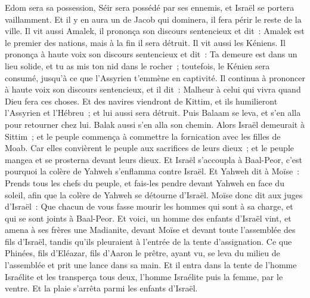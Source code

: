 \begin{multicols}{2}
Edom sera sa possession, Séir sera possédé par ses ennemis, et Israël se portera vaillamment.
Et il y en aura un de Jacob qui dominera, il fera périr le reste de la ville.
Il vit aussi Amalek, il prononça son discours sentencieux et dit~: Amalek est le premier des nations, mais à la fin il sera détruit.
Il vit aussi les Kéniens. Il prononça à haute voix son discours sentencieux et dit~: Ta demeure est dans un lieu solide, et tu as mis ton nid dans le rocher~;
toutefois, le Kénien sera consumé, jusqu'à ce que l'Assyrien t'emmène en captivité.
Il continua à prononcer à haute voix son discours sentencieux, et il dit~: Malheur à celui qui vivra quand Dieu fera ces choses.
Et des navires viendront de Kittim, et ils humilieront l'Assyrien et l'Hébreu~; et lui aussi sera détruit.
Puis Balaam se leva, et s'en alla pour retourner chez lui. Balak aussi s'en alla son chemin.
\VerseOne{}Alors Israël demeurait à Sittim~; et le peuple commença à commettre la fornication avec les filles de Moab.
Car elles convièrent le peuple aux sacrifices de leurs dieux~; et le peuple mangea et se prosterna devant leurs dieux.
Et Israël s'accoupla à Baal-Peor, c'est pourquoi la colère de Yahweh s'enflamma contre Israël.
Et Yahweh dit à Moïse~: Prends tous les chefs du peuple, et fais-les pendre devant Yahweh en face du soleil, afin que la colère de Yahweh se détourne d'Israël.
Moïse donc dit aux juges d'Israël~: Que chacun de vous fasse mourir les hommes qui sont à sa charge, et qui se sont joints à Baal-Peor.
Et voici, un homme des enfants d'Israël vint, et amena à ses frères une Madianite, devant Moïse et devant toute l'assemblée des fils d'Israël, tandis qu'ils pleuraient à l'entrée de la tente d'assignation.
Ce que Phinées, fils d'Eléazar, fils d'Aaron le prêtre, ayant vu, se leva du milieu de l'assemblée et prit une lance dans sa main.
Et il entra dans la tente de l'homme Israélite et les transperça tous deux, l'homme Israélite puis la femme, par le ventre. Et la plaie s'arrêta parmi les enfants d'Israël.

\end{multicols}
